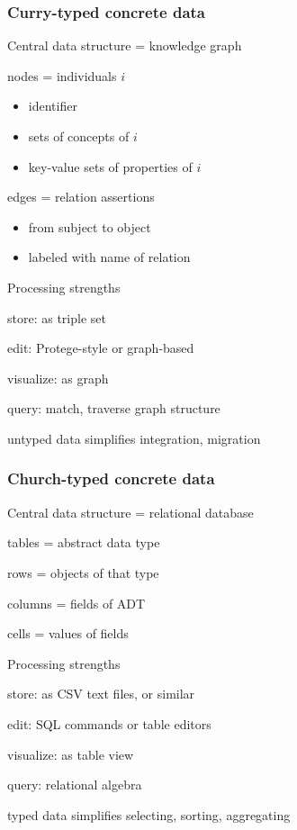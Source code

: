 \begin{frame}\frametitle{Curry-typed concrete data}
\begin{blockitems}{Central data structure = knowledge graph}
\item nodes = individuals $i$
 \begin{itemize}
 \item identifier
 \item sets of concepts of $i$
 \item key-value sets of properties of $i$
 \end{itemize}
\item edges = relation assertions
 \begin{itemize}
 \item from subject to object
 \item labeled with name of relation
 \end{itemize}
\end{blockitems}

\begin{blockitems}{Processing strengths}
\item store: as triple set
\item edit: Protege-style or graph-based
\item visualize: as graph
\item query: match, traverse graph structure
\item untyped data simplifies integration, migration
\end{blockitems}
\end{frame}

\begin{frame}\frametitle{Church-typed concrete data}
\begin{blockitems}{Central data structure = relational database}
\item tables = abstract data type
\item rows = objects of that type
\item columns = fields of ADT
\item cells = values of fields
\end{blockitems}

\begin{blockitems}{Processing strengths}
\item store: as CSV text files, or similar
\item edit: SQL commands or table editors
\item visualize: as table view
\item query: relational algebra
\item typed data simplifies selecting, sorting, aggregating
\end{blockitems}
\end{frame}

